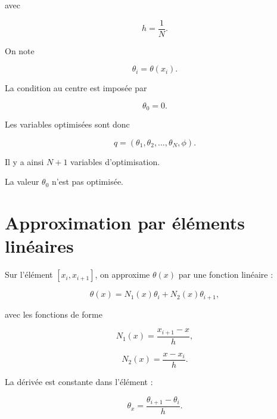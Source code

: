 \documentclass[a4paper,11pt]{article}
\begin{document}
avec

\begin{equation}
\boxed{
h=\frac{1}{N}.
}
\end{equation}

On note

\begin{equation}
\theta_i=\theta(x_i).
\end{equation}

La condition au centre est imposée par

\begin{equation}
\boxed{
\theta_0=0.
}
\end{equation}

Les variables optimisées sont donc

\begin{equation}
\boxed{
q=
(\theta_1,\theta_2,\ldots,\theta_N,\phi).
}
\end{equation}

Il y a ainsi $N+1$ variables d'optimisation.

La valeur $\theta_0$ n'est pas optimisée.

\section{Approximation par éléments linéaires}

Sur l'élément $[x_i,x_{i+1}]$, on approxime $\theta(x)$ par une fonction
linéaire :

\begin{equation}
\theta(x)
=
N_1(x)\theta_i
+
N_2(x)\theta_{i+1},
\end{equation}

avec les fonctions de forme

\begin{equation}
N_1(x)=\frac{x_{i+1}-x}{h},
\end{equation}

\begin{equation}
N_2(x)=\frac{x-x_i}{h}.
\end{equation}

La dérivée est constante dans l'élément :

\begin{equation}
\boxed{
\theta_x
=
\frac{\theta_{i+1}-\theta_i}{h}.
}
\end{equation}

\end{document}
